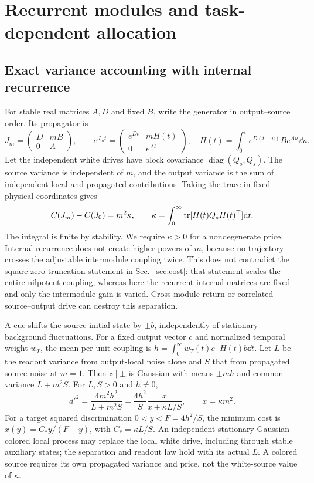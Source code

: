 \section{Recurrent modules and task-dependent allocation}
\label{sec:modularsupp}

\subsection{Exact variance accounting with internal recurrence}

For stable real matrices \(A,D\) and fixed \(B\), write the
generator in output--source order. Its propagator is
\begin{equation}
 J_m=\begin{pmatrix}D&mB\\0&A\end{pmatrix},\qquad
 e^{J_m t}=\begin{pmatrix}e^{Dt}&mH(t)\\0&e^{At}\end{pmatrix},
 \quad H(t)=\int_0^t e^{D(t-u)}B e^{Au}\dd u.
 \label{eq:modularprop}
\end{equation}
Let the independent white drives have block covariance
\(\operatorname{diag}(Q_o,Q_s)\). The source variance is independent
of \(m\), and the output variance is the sum of independent local
and propagated contributions. Taking the trace in fixed physical
coordinates gives
\begin{equation}
 C(J_m)-C(J_0)=m^2\kappa,\qquad
 \kappa=\int_0^\infty\operatorname{tr}[H(t)Q_s H(t)^\top]\mathrm{d} t.
 \label{eq:modularcost}
\end{equation}
The integral is finite by stability. We require \(\kappa>0\)
for a nondegenerate price. Internal recurrence does not create
higher powers of \(m\), because no trajectory crosses the adjustable
intermodule coupling twice. This does not contradict the
square-zero truncation statement in Sec.~\ref{sec:cost}: that
statement scales the entire nilpotent coupling, whereas here
the recurrent internal matrices are fixed and only the
intermodule gain is varied. Cross-module return or correlated
source--output drive can destroy this separation.

A cue shifts the source initial state by \(\pm b\), independently
of stationary background fluctuations. For a fixed output vector
\(c\) and normalized temporal weight \(w_T\), the mean per unit
coupling is \(h=\int_0^\infty w_T(t)c^\top H(t)b\dd t\).
Let \(L\) be the readout variance from output-local noise alone
and \(S\) that from propagated source noise at \(m=1\).
Then \(z\mid\pm\) is Gaussian with means \(\pm mh\) and common
variance \(L+m^2S\). For \(L,S>0\) and \(h\ne0\),
\[
 d'^2=\frac{4m^2h^2}{L+m^2S}
     =\frac{4h^2}{S}\frac{x}{x+\kappa L/S},\qquad x=\kappa m^2.
\]
For a target squared discrimination \(0<y<F=4h^2/S\), the
minimum cost is \(x(y)=C_*y/(F-y)\), with \(C_*=\kappa L/S\).
An independent stationary Gaussian colored local process may
replace the local white drive, including through stable auxiliary
states; the separation and readout law hold with its actual
\(L\). A colored source requires its own propagated variance
and price, not the white-source value of \(\kappa\).

